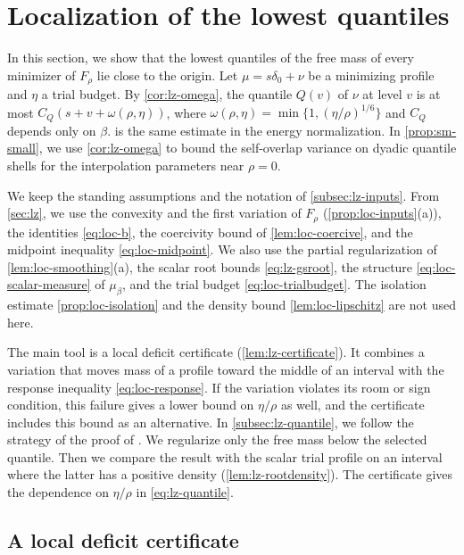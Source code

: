 \chapter{Localization of the lowest quantiles}\label{sec:lz-root}

In this section, we show that the lowest quantiles of the free mass of every
minimizer of $F_\rho$ lie close to the origin. Let $\mu=s\delta_0+\nu$ be a
minimizing profile and $\eta$ a trial budget. By \cref{cor:lz-omega}, the
quantile $Q(v)$ of $\nu$ at level $v$ is at most
$C_Q(s+v+\omega(\rho,\eta))$, where
$\omega(\rho,\eta)=\min\{1,(\eta/\rho)^{1/6}\}$ and $C_Q$ depends only on
$\beta$.  is the same estimate in the energy
normalization. In \cref{prop:sm-small}, we use \cref{cor:lz-omega} to bound the
self-overlap variance on dyadic quantile shells for the interpolation
parameters near $\rho=0$.

We keep the standing assumptions and the notation of \cref{subsec:lz-inputs}.
From \cref{sec:lz}, we use the convexity and the first variation of $F_\rho$
(\cref{prop:loc-inputs}(a)), the identities \eqref{eq:loc-b}, the coercivity
bound of \cref{lem:loc-coercive}, and the midpoint inequality
\eqref{eq:loc-midpoint}. We also use the partial regularization of
\cref{lem:loc-smoothing}(a), the scalar root bounds \eqref{eq:lz-gsroot}, the
structure \eqref{eq:loc-scalar-measure} of $\mu_\beta$, and the trial budget
\eqref{eq:loc-trialbudget}. The isolation estimate \cref{prop:loc-isolation}
and the density bound \cref{lem:loc-lipschitz} are not used here.

The main tool is a local deficit certificate (\cref{lem:lz-certificate}). It
combines a variation that moves mass of a
profile toward the middle of an interval with the response inequality
\eqref{eq:loc-response}. If the variation violates its room or sign
condition, this failure gives a lower bound on $\eta/\rho$ as well, and the
certificate includes this bound as an alternative. In
\cref{subsec:lz-quantile}, we follow the strategy of the proof of
\cite[Lemma~7.6]{AL}. We regularize only the free mass below the selected
quantile. Then we compare the result with the scalar trial profile on an
interval where the latter has a positive density (\cref{lem:lz-rootdensity}).
The certificate gives the dependence on $\eta/\rho$ in \eqref{eq:lz-quantile}.

\section{A local deficit certificate}\label{subsec:lz-moves}


